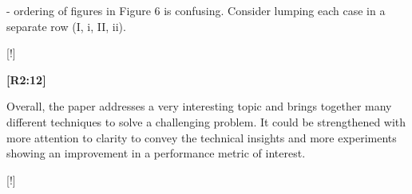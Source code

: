 \documentclass[10pt]{letter}
\begin{document}
- ordering of figures in Figure 6 is confusing. Consider lumping each case in a separate row (I, i, II, ii). 
  
{\color{blue} 

{\hspace*{-4.5em}{[R2:11]}\vspace*{-1.9em}}

[!]
}

\vspace*{2em}

{\hspace*{-4.5em}\textbf{[R2:12]}\vspace*{-1.9em}}

Overall, the paper addresses a very interesting topic and brings together many different techniques to solve a challenging problem. It could be strengthened with more attention to clarity to convey the technical insights and more experiments showing an improvement in a performance metric of interest.

{\color{blue} 

{\hspace*{-4.5em}{[R2:12]}\vspace*{-1.9em}}

[!]}


\vspace{1em}



\vspace{2em}
\end{document}
